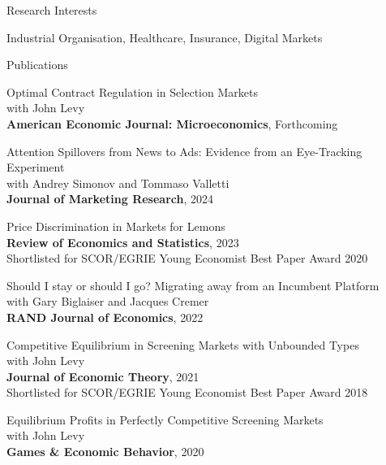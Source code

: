 \documentclass{resume}
\begin{document}
\begin{rSection}{Research Interests}

Industrial Organisation, Healthcare, Insurance, Digital Markets
	
\end{rSection}









\begin{rSection}{Publications}

\begin{etaremune}

\item Optimal Contract Regulation in Selection Markets \\
with John Levy\\ \textbf{American Economic Journal: Microeconomics}, Forthcoming

\item Attention Spillovers from News to Ads: Evidence from an Eye-Tracking Experiment \\ 
with Andrey Simonov and Tommaso Valletti\\ \textbf{Journal of Marketing Research}, 2024

\item Price Discrimination in Markets for Lemons \\ 
\textbf{Review of Economics and Statistics}, 2023 \\
Shortlisted for SCOR/EGRIE Young Economist Best Paper Award 2020

\item Should I stay or should I go? Migrating away from an Incumbent Platform \\ 
with Gary Biglaiser and Jacques Cremer \\ 
\textbf{RAND Journal of Economics}, 2022

\item Competitive Equilibrium in Screening Markets with Unbounded Types\\ 
with John Levy \\
\textbf{Journal of Economic Theory}, 2021
\\ Shortlisted for SCOR/EGRIE Young Economist Best Paper Award 2018

\item Equilibrium Profits in Perfectly Competitive Screening Markets\\
with John Levy \\
\textbf{Games \& Economic Behavior}, 2020


\end{etaremune}
\end{rSection}
\end{document}
